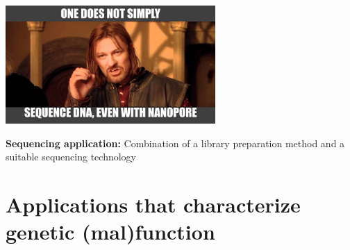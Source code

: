 \documentclass[10pt]{beamer}
\newcommand{\feature}[1]{{\color{scLime} \textbf{#1}}}
\begin{document}
\begin{frame}[standout]{}
	\includegraphics[width=0.6\textwidth]{./figures/onedoesnotsimplyB2.jpg} \par
	\feature{Sequencing application:} Combination of a library preparation method and a suitable sequencing technology 
\end{frame}


\section{Applications that characterize genetic (mal)function}

\end{document}
